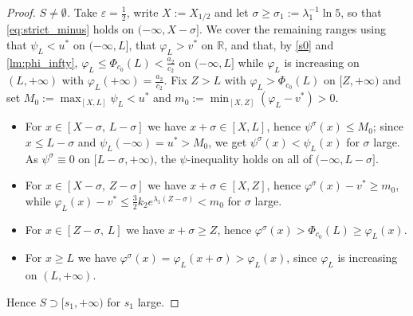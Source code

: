 \documentclass[reqno]{amsart}
\theoremstyle{plain}
\theoremstyle{definition}
\theoremstyle{remark}
\begin{document}
\begin{proof}
	\emph{$S\ne\emptyset$.} Take $\varepsilon=\frac12$, write $X:=X_{1/2}$ and let
	$\sigma\ge\sigma_1:=\lambda_1^{-1}\ln5$, so that \eqref{eq:strict_minus} holds
	on $(-\infty,X-\sigma]$. We cover the remaining ranges using that
	$\psi_L<u^*$ on $(-\infty,L]$, that $\varphi_L>v^*$ on $\mathbb{R}$, and that, by
	\eqref{s0} and \cref{lm:phi_infty}, $\varphi_L\le\Phi_{c_0}(L)<\frac{a_2}{c_2}$
	on $(-\infty,L]$ while $\varphi_L$ is increasing on $(L,+\infty)$ with
	$\varphi_L(+\infty)=\frac{a_2}{c_2}$. Fix $Z>L$ with
	$\varphi_L>\Phi_{c_0}(L)$ on $[Z,+\infty)$ and set
	$M_0:=\max_{[X,L]}\psi_L<u^*$ and $m_0:=\min_{[X,Z]}(\varphi_L-v^*)>0$.
	\begin{itemize}
		\item For $x\in[X-\sigma,\,L-\sigma]$ we have $x+\sigma\in[X,L]$, hence
		$\psi^\sigma(x)\le M_0$; since $x\le L-\sigma$ and $\psi_L(-\infty)=u^*>M_0$,
		we get $\psi^\sigma(x)<\psi_L(x)$ for $\sigma$ large. As
		$\psi^\sigma\equiv0$ on $[L-\sigma,+\infty)$, the $\psi$-inequality holds on
		all of $(-\infty,L-\sigma]$.
		\item For $x\in[X-\sigma,\,Z-\sigma]$ we have $x+\sigma\in[X,Z]$, hence
		$\varphi^\sigma(x)-v^*\ge m_0$, while
		$\varphi_L(x)-v^*\le\frac32k_2e^{\lambda_1(Z-\sigma)}<m_0$ for $\sigma$ large.
		\item For $x\in[Z-\sigma,\,L]$ we have $x+\sigma\ge Z$, hence
		$\varphi^\sigma(x)>\Phi_{c_0}(L)\ge\varphi_L(x)$.
		\item For $x\ge L$ we have $\varphi^\sigma(x)=\varphi_L(x+\sigma)>\varphi_L(x)$,
		since $\varphi_L$ is increasing on $(L,+\infty)$.
	\end{itemize}
	Hence $S\supset[s_1,+\infty)$ for $s_1$ large.


\end{proof}
\end{document}
